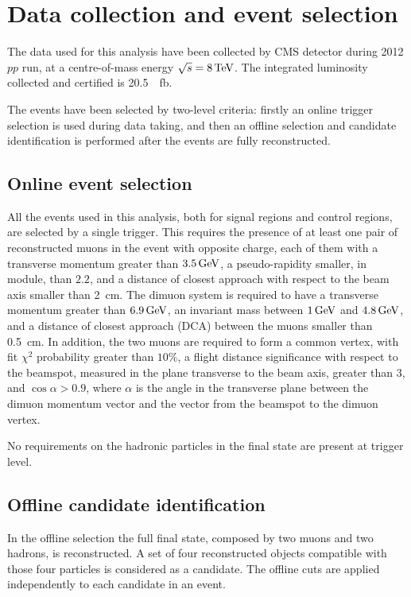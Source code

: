 \chapter{Data collection and event selection}\label{sec:selection}

The data used for this analysis have been collected by CMS detector during 2012 $pp$ run, at a centre-of-mass energy $\sqrt{s}=8\,\textrm{TeV}$.
The integrated luminosity collected and certified is \SI{20.5}{\per\femto\barn}.

The events have been selected by two-level criteria: firstly an online trigger selection is used during data taking, and then an offline selection and candidate identification is performed after the events are fully reconstructed.

\section{Online event selection}
\label{sec:onsel}
All the events used in this analysis, both for signal regions and control regions, are selected by a single trigger.
This requires the presence of at least one pair of reconstructed muons in the event with opposite charge, each of them with a transverse momentum greater than $3.5\,\textrm{GeV}$, a pseudo-rapidity smaller, in module, than $2.2$, and a distance of closest approach with respect to the beam axis smaller than \SI{2}{\centi\metre}.
The dimuon system is required to have a transverse momentum greater than $6.9\,\textrm{GeV}$, an invariant mass between $1\,\textrm{GeV}$ and $4.8\,\textrm{GeV}$, and a distance of closest approach (DCA) between the muons smaller than \SI{0.5}{\centi\metre}.
In addition, the two muons are required to form a common vertex, with fit $\chi^2$ probability greater than $10\%$, a flight distance significance with respect to the beamspot, measured in the plane transverse to the beam axis, greater than 3, and $\cos{\alpha}>0.9$, where $\alpha$ is the angle in the transverse plane between the dimuon momentum vector and the vector from the beamspot to the dimuon vertex.

No requirements on the hadronic particles in the final state are present at trigger level.

\section{Offline candidate identification}
\label{sec:offsel}

In the offline selection the full final state, composed by two muons and two hadrons, is reconstructed.
A set of four reconstructed objects compatible with those four particles is considered as a candidate.
The offline cuts are applied independently to each candidate in an event.


